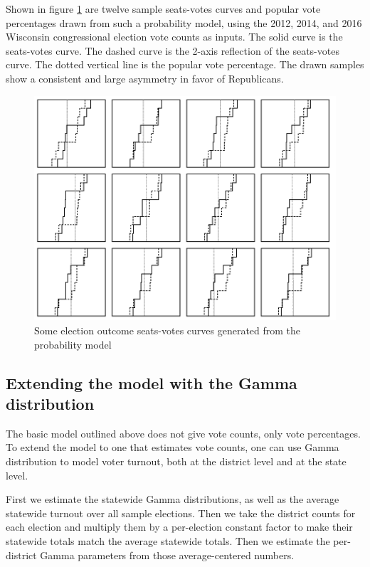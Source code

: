 \documentclass[preprint,12pt]{article}
\begin{document}
Shown in figure \ref{fig:SVCongress} are twelve sample seats-votes curves and popular vote percentages drawn from such a probability model, using the 2012, 2014, and 2016 Wisconsin congressional election vote counts as inputs.  The solid curve is the seats-votes curve.  The dashed curve is the 2-axis reflection of the seats-votes curve.  The dotted vertical line is the popular vote percentage.  The drawn samples show a consistent and large asymmetry in favor of Republicans.

\begin{figure}[htb!]
    \begin{center}
        \includegraphics[scale=0.6]{../Figures/WI2010/sv_curves_congress.png}
        \caption{Some election outcome seats-votes curves generated from the probability model}\label{fig:SVCongress}
    \end{center}
\end{figure}
 
\subsection{Extending the model with the Gamma distribution}
 
The basic model outlined above does not give vote counts, only vote percentages.  To extend the model to one that estimates vote counts, one can use Gamma distribution to model voter turnout, both at the district level and at the state level.
 
First we estimate the statewide Gamma distributions, as well as the average statewide turnout over all sample elections.   Then we take the district counts for each election and multiply them by a per-election constant factor to make their statewide totals match the average statewide totals.  Then we estimate the per-district Gamma parameters from those average-centered numbers.
 
\end{document}
